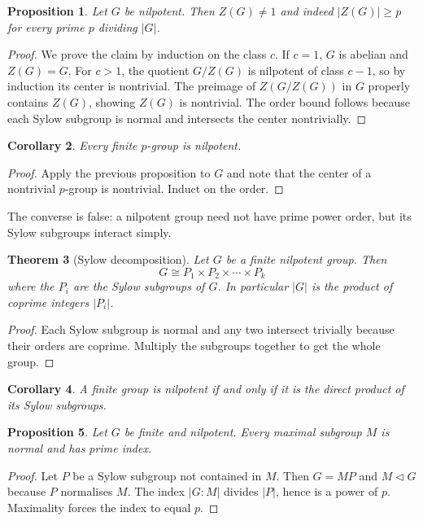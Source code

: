 \documentclass{article}
\newtheorem{theorem}{Theorem}[section]
\newtheorem{proposition}[theorem]{Proposition}
\newtheorem{corollary}[theorem]{Corollary}
\theoremstyle{definition}
\begin{document}
\begin{proposition}
Let $G$ be nilpotent.  Then $Z(G)\ne 1$ and indeed $|Z(G)|\ge p$ for every prime $p$ dividing $|G|$.
\end{proposition}
\begin{proof}
We prove the claim by induction on the class $c$.  If $c=1$, $G$ is abelian and $Z(G)=G$.  For $c>1$, the quotient $G/Z(G)$ is nilpotent of class $c-1$, so by induction its center is nontrivial.  The preimage of $Z(G/Z(G))$ in $G$ properly contains $Z(G)$, showing $Z(G)$ is nontrivial.  The order bound follows because each Sylow subgroup is normal and intersects the center nontrivially.
\end{proof}

\begin{corollary}
Every finite $p$-group is nilpotent.
\end{corollary}
\begin{proof}
Apply the previous proposition to $G$ and note that the center of a nontrivial $p$-group is nontrivial.  Induct on the order.
\end{proof}

The converse is false: a nilpotent group need not have prime power order, but its Sylow subgroups interact simply.

\begin{theorem}[Sylow decomposition]
Let $G$ be a finite nilpotent group.  Then 
\[
G \cong P_1 \times P_2 \times \cdots \times P_k
\]
where the $P_i$ are the Sylow subgroups of $G$.  In particular $|G|$ is the product of coprime integers $|P_i|$.
\end{theorem}
\begin{proof}
Each Sylow subgroup is normal and any two intersect trivially because their orders are coprime.  Multiply the subgroups together to get the whole group.
\end{proof}

\begin{corollary}
A finite group is nilpotent if and only if it is the direct product of its Sylow subgroups.
\end{corollary}

\begin{proposition}
Let $G$ be finite and nilpotent.  Every maximal subgroup $M$ is normal and has prime index.
\end{proposition}
\begin{proof}
Let $P$ be a Sylow subgroup not contained in $M$.  Then $G=MP$ and $M\triangleleft G$ because $P$ normalises $M$.  The index $|G:M|$ divides $|P|$, hence is a power of $p$.  Maximality forces the index to equal $p$.
\end{proof}
\end{document}
